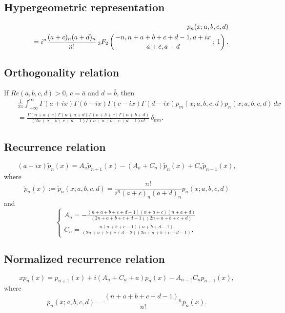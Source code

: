 \documentclass[envcountchap,graybox]{svmono}
\newcommand{\hyp}[5]{\mbox{}_{#1}{F}_{#2}
\left(\genfrac{}{}{0pt}{}{#3}{#4}\,;\,#5\right)}
\renewcommand{\Gamma}{\varGamma}
\begin{document}
\par\setcounter{equation}{0}

\subsection*{Hypergeometric representation}
\begin{eqnarray}
\label{DefContHahn}
& &p_n(x;a,b,c,d)\nonumber\\
& &{}=i^n\frac{(a+c)_n(a+d)_n}{n!}\,\hyp{3}{2}{-n,n+a+b+c+d-1,a+ix}{a+c,a+d}{1}.
\end{eqnarray}

\subsection*{Orthogonality relation}
If $Re(a,b,c,d)>0$, $c=\bar{a}$ and $d=\bar{b}$, then
\begin{eqnarray}
\label{OrtContHahn}
& &\frac{1}{2\pi}\int_{-\infty}^{\infty}\Gamma(a+ix)\Gamma(b+ix)\Gamma(c-ix)\Gamma(d-ix)
p_m(x;a,b,c,d)p_n(x;a,b,c,d)\,dx\nonumber\\
& &{}=\frac{\Gamma(n+a+c)\Gamma(n+a+d)\Gamma(n+b+c)\Gamma(n+b+d)}
{(2n+a+b+c+d-1)\Gamma(n+a+b+c+d-1)n!}\,\delta_{mn}.
\end{eqnarray}

\subsection*{Recurrence relation}
\begin{equation}
\label{RecContHahn}
(a+ix)\tilde{p}_n(x)=A_n\tilde{p}_{n+1}(x)-\left(A_n+C_n\right)\tilde{p}_n(x)+C_n\tilde{p}_{n-1}(x),
\end{equation}
where
$$\tilde{p}_n(x):=\tilde{p}_n(x;a,b,c,d)=\frac{n!}{i^n(a+c)_n(a+d)_n}p_n(x;a,b,c,d)$$
and
$$\left\{\begin{array}{l}
\displaystyle A_n=-\frac{(n+a+b+c+d-1)(n+a+c)(n+a+d)}{(2n+a+b+c+d-1)(2n+a+b+c+d)}\\[5mm]
\displaystyle C_n=\frac{n(n+b+c-1)(n+b+d-1)}{(2n+a+b+c+d-2)(2n+a+b+c+d-1)}.
\end{array}\right.$$

\subsection*{Normalized recurrence relation}
\begin{equation}
\label{NormRecContHahn}
xp_n(x)=p_{n+1}(x)+i(A_n+C_n+a)p_n(x)-A_{n-1}C_np_{n-1}(x),
\end{equation}
where
$$p_n(x;a,b,c,d)=\frac{(n+a+b+c+d-1)_n}{n!}p_n(x).$$
\end{document}
